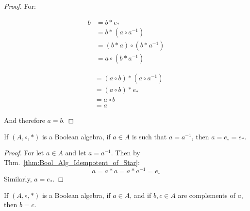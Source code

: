     \begin{proof}
        For:
        \par
        \begin{minipage}[b]{0.49\textwidth}
            \centering
            \begin{align}
                b&=b*e_{*}\tag{Identity}\\
                 &=b*(a\circ a^{-1})\tag{Complement}\\
                 &=(b*a)\circ(b* a^{-1})\tag{Distributivity}\\
                 &=a\circ (b* a^{-1})\tag{Hypothesis}
            \end{align}
        \end{minipage}
        \hfill
        \begin{minipage}[b]{0.49\textwidth}
            \centering
            \begin{align}
                &=(a\circ b)*(a\circ a^{-1})\tag{Distributivity}\\
                &=(a\circ{b})*e_{*}\tag{Complement}\\
                &=a\circ{b}\tag{Identity}\\
                &=a\tag{Hypothesis}
            \end{align}
        \end{minipage}
        \par\vspace{2.5ex}
        And therefore $a=b$.
    \end{proof}
    \begin{theorem}
        If $(A,\circ,*)$ is a Boolean algebra, if $a\in{A}$ is such that
        $a=a^{\minus{1}}$, then $a=e_{\circ}=e_{*}$.
    \end{theorem}
    \begin{proof}
        For let $a\in{A}$ and let $a=a^{\minus{1}}$. Then by
        Thm.~\ref{thm:Bool_Alg_Idempotent_of_Star}:
        \begin{equation}
            a=a*a=a*a^{-1}=e_{\circ}
        \end{equation}
        Similarly, $a=e_{*}$.
    \end{proof}
    \begin{theorem}
        If $(A,\circ,*)$ is a Boolean algebra, if $a\in{A}$, and if $b,c\in{A}$
        are complements of $a$, then $b=c$.
    \end{theorem}
